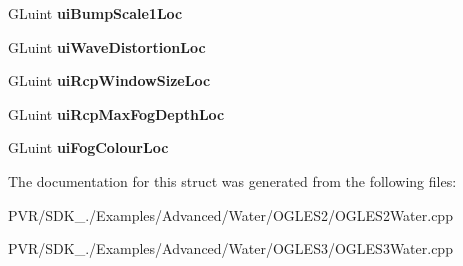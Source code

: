\begin{DoxyCompactItemize}
\item 
\hypertarget{struct_water_shader_a393e6291324bac2b5aca6145d3fc19f9}{G\+Luint {\bfseries ui\+Bump\+Scale1\+Loc}}\label{struct_water_shader_a393e6291324bac2b5aca6145d3fc19f9}

\item 
\hypertarget{struct_water_shader_a464856d381b364ab575438a226c4a7ef}{G\+Luint {\bfseries ui\+Wave\+Distortion\+Loc}}\label{struct_water_shader_a464856d381b364ab575438a226c4a7ef}

\item 
\hypertarget{struct_water_shader_a093644c6c5397b4f4a6321a9222abccf}{G\+Luint {\bfseries ui\+Rcp\+Window\+Size\+Loc}}\label{struct_water_shader_a093644c6c5397b4f4a6321a9222abccf}

\item 
\hypertarget{struct_water_shader_a4d805dfab6c8677fc49fc5416c281d3d}{G\+Luint {\bfseries ui\+Rcp\+Max\+Fog\+Depth\+Loc}}\label{struct_water_shader_a4d805dfab6c8677fc49fc5416c281d3d}

\item 
\hypertarget{struct_water_shader_a9dab6cc7df275b7f3a051768199fa7ae}{G\+Luint {\bfseries ui\+Fog\+Colour\+Loc}}\label{struct_water_shader_a9dab6cc7df275b7f3a051768199fa7ae}

\end{DoxyCompactItemize}


The documentation for this struct was generated from the following files\+:\begin{DoxyCompactItemize}
\item 
P\+V\+R/\+S\+D\+K\+\_./\+Examples/\+Advanced/\+Water/\+O\+G\+L\+E\+S2/O\+G\+L\+E\+S2\+Water.\+cpp\item 
P\+V\+R/\+S\+D\+K\+\_./\+Examples/\+Advanced/\+Water/\+O\+G\+L\+E\+S3/O\+G\+L\+E\+S3\+Water.\+cpp\end{DoxyCompactItemize}
